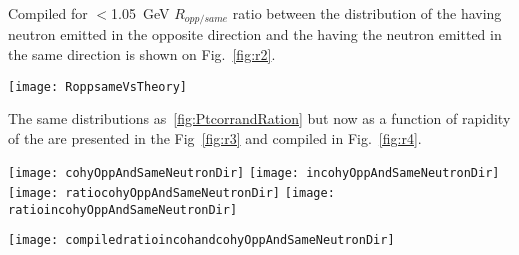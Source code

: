     Compiled for \pt$<$1.05~GeV $R_{opp/same}$ ratio between the \pt 
      distribution of the \JPsi having neutron emitted in the opposite 
      direction and  the \JPsi having the neutron emitted in the same
      direction is shown on Fig.~\ref{fig:r2}. 
    \begin{figure*}[!Hhtb]
      \begin{center}
        \texttt{[image: RoppsameVsTheory]}
        \caption{ \label{fig:r2} Ratio between the transverse momentum 
          distribution of the $J/\psi$ when  $J/\psi$ and neutron have 
          the opposite direction and the transverse momentum distribution 
          of the $J/\psi$ when  $J/\psi$ and neutron have the same direction.}
      \end{center}
    \end{figure*}
    The same distributions as~\ref{fig:PtcorrandRation} but now as a function 
      of rapidity of the \JPsi are presented in the Fig~\ref{fig:r3} and 
      compiled in Fig.~\ref{fig:r4}. 
    
    \begin{figure*}[!Hhtb]
      \begin{center}
        \texttt{[image: cohyOppAndSameNeutronDir]}
        \texttt{[image: incohyOppAndSameNeutronDir]}\\
        \texttt{[image: ratiocohyOppAndSameNeutronDir]}
        \texttt{[image: ratioincohyOppAndSameNeutronDir]}
        \caption{ \label{fig:r3} Rapidity distribution of the $J/\psi$ when  
          $J/\psi$ and neutron have the opposite rapidity direction and the 
          rapidity distribution of the $J/\psi$ when  $J/\psi$ and neutron 
          have the same rapidity direction for low-\pt (top left) and high-\pt 
          (top right) \JPsi. Bottom: Ratios $R_{opp/same}$ for low-\pt ( left) 
          and high-\pt ( right) \JPsi.}
      \end{center}
    \end{figure*}
    
    \begin{figure*}[!Hhtb]
      \begin{center}
        \texttt{[image: compiledratioincohandcohyOppAndSameNeutronDir]}
        \caption{ \label{fig:r4} Rapidity ratios $R_{opp/same}$ for low-\pt 
          ( left) and high-\pt ( right) \JPsi.}
      \end{center}
    \end{figure*}
    
